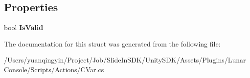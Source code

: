 \subsection*{Properties}
\begin{DoxyCompactItemize}
\item 
\mbox{\label{struct_lunar_console_plugin_1_1_c_var_value_range_a9d3b624b4fccf1f0dc0ec863b4226d92}} 
bool {\bfseries Is\+Valid}
\end{DoxyCompactItemize}


The documentation for this struct was generated from the following file\+:\begin{DoxyCompactItemize}
\item 
/\+Users/yuanqingyin/\+Project/\+Job/\+Slide\+In\+S\+D\+K/\+Unity\+S\+D\+K/\+Assets/\+Plugins/\+Lunar\+Console/\+Scripts/\+Actions/C\+Var.\+cs\end{DoxyCompactItemize}
